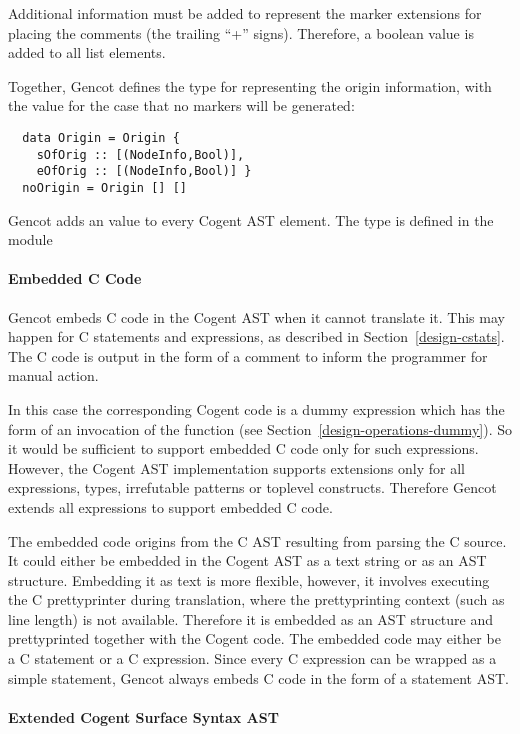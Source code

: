 Additional information must be added to represent the marker extensions for placing the comments (the trailing ``+'' signs).
Therefore, a boolean value is added to all list elements.

Together, Gencot defines the type  for representing the origin information, with the value 
for the case that no markers will be generated:
\begin{verbatim}
  data Origin = Origin { 
    sOfOrig :: [(NodeInfo,Bool)], 
    eOfOrig :: [(NodeInfo,Bool)] } 
  noOrigin = Origin [] []
\end{verbatim}
Gencot adds an  value to every Cogent AST element. The type  is defined in the module 

\paragraph{Embedded C Code}

Gencot embeds C code in the Cogent AST when it cannot translate it. This may happen for C statements and expressions, as
described in Section~\ref{design-cstats}. The C code is output in the form of a comment to inform the programmer for 
manual action.

In this case the corresponding Cogent code is a dummy expression which has the form of an invocation of the function
 (see Section~\ref{design-operations-dummy}). So it would be sufficient to support embedded C code
only for such expressions. However, the Cogent AST implementation supports extensions only for all expressions, types, 
irrefutable patterns or toplevel constructs. Therefore Gencot extends all expressions to support embedded C code.

The embedded code origins from the C AST resulting from parsing the C source. It could either be embedded in the Cogent 
AST as a text string or as an AST structure. Embedding it as text is more flexible, however, it involves executing the 
C prettyprinter during translation, where the prettyprinting context (such as line length) is not available. Therefore 
it is embedded as an AST structure and prettyprinted together with the Cogent code. The embedded code may either be a 
C statement or a C expression. Since every C expression can be wrapped as a simple statement, Gencot always embeds C
code in the form of a statement AST.

\paragraph{Extended Cogent Surface Syntax AST}

